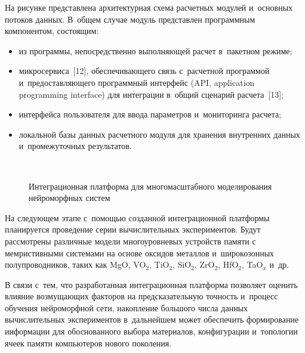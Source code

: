 \begin{multicols}{2}
    На рисунке представлена архитектурная схема расчетных модулей 
и~основных потоков данных. В~общем случае модуль представлен программным 
компонентом, состоящим:
    \begin{itemize}
\item из программы, непосредственно выполняющей расчет в~пакетном 
режиме; 
\item микросервиса~[12], обеспечивающего связь с~расчетной программой 
и~предоставляющего программный интерфейс (API, application programming interface) для интеграции 
в~общий сценарий расчета~[13];
\item интерфейса пользователя для ввода параметров и~мониторинга расчета;
\item локальной базы данных расчетного модуля для хранения внутренних 
данных и~промежуточных результатов.
\end{itemize}

\begin{figure*} %
\vspace*{1pt}
 \begin{center}
 \mbox{%
 \epsfxsize=156.22mm 
 }
\vspace*{12pt}

{\small Интеграционная платформа для многомасштабного моделирования нейроморфных 
систем}
 \end{center}
\end{figure*}

      На следующем этапе с~помощью созданной интеграционной платформы 
    планируется проведение серии вычислительных экспериментов. Будут 
    рассмотрены различные модели многоуровневых устройств памяти с~
    мемристивными системами на основе оксидов металлов и~широкозонных 
    полупроводников, таких как MgO, VO$_2$, TiO$_2$, SiO$_2$, ZrO$_2$, HfO$_2$, 
TaO$_x$ и~др. 
      
    В связи с~тем, что разработанная интеграционная платформа позволяет 
оценить влияние возмущающих факторов на предсказательную точность 
и~процесс обучения нейроморфной сети, накопление большого числа данных 
вычислительных экспериментов в~дальнейшем может обеспечить формирование 
информации для обоснованного выбора материалов, конфигурации и~топологии 
ячеек памяти компьютеров нового поколения.
  
{\small\frenchspacing
 {%
 \begin{thebibliography}{99}
  

\end{thebibliography}}}
\end{multicols}
